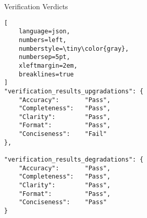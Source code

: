 


\begin{promptbox}{Verification Verdicts}
\begin{lstlisting}[
    language=json,
    numbers=left,
    numberstyle=\tiny\color{gray},
    numbersep=5pt,
    xleftmargin=2em,
    breaklines=true
]
"verification_results_upgradations": {
    "Accuracy":       "Pass",
    "Completeness":   "Pass",
    "Clarity":        "Pass",
    "Format":         "Pass",
    "Conciseness":    "Fail"
},

"verification_results_degradations": {
    "Accuracy":       "Pass",
    "Completeness":   "Pass",
    "Clarity":        "Pass",
    "Format":         "Pass",
    "Conciseness":    "Pass"
}
\end{lstlisting}
\end{promptbox}
